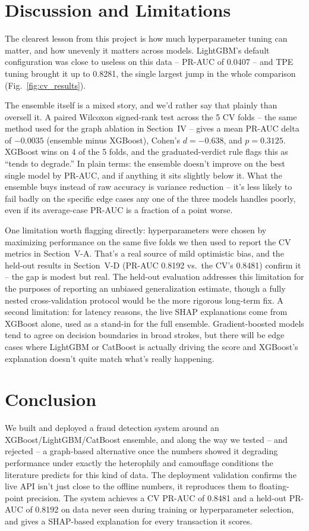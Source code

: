 \documentclass[conference]{IEEEtran}
\begin{document}
\section{Discussion and Limitations}
The clearest lesson from this project is how much hyperparameter tuning can matter, and how unevenly it matters across models. LightGBM's default configuration was close to useless on this data -- PR-AUC of 0.0407 -- and TPE tuning brought it up to 0.8281, the single largest jump in the whole comparison (Fig.~\ref{fig:cv_results}).

The ensemble itself is a mixed story, and we'd rather say that plainly than oversell it. A paired Wilcoxon signed-rank test across the 5 CV folds -- the same method used for the graph ablation in Section~IV -- gives a mean PR-AUC delta of $-0.0035$ (ensemble minus XGBoost), Cohen's $d = -0.638$, and $p = 0.3125$. XGBoost wins on 4 of the 5 folds, and the graduated-verdict rule flags this as ``tends to degrade.'' In plain terms: the ensemble doesn't improve on the best single model by PR-AUC, and if anything it sits slightly below it. What the ensemble buys instead of raw accuracy is variance reduction -- it's less likely to fail badly on the specific edge cases any one of the three models handles poorly, even if its average-case PR-AUC is a fraction of a point worse.

One limitation worth flagging directly: hyperparameters were chosen by maximizing performance on the same five folds we then used to report the CV metrics in Section~V-A. That's a real source of mild optimistic bias, and the held-out results in Section~V-D (PR-AUC 0.8192 vs.\ the CV's 0.8481) confirm it -- the gap is modest but real. The held-out evaluation addresses this limitation for the purposes of reporting an unbiased generalization estimate, though a fully nested cross-validation protocol would be the more rigorous long-term fix. A second limitation: for latency reasons, the live SHAP explanations come from XGBoost alone, used as a stand-in for the full ensemble. Gradient-boosted models tend to agree on decision boundaries in broad strokes, but there will be edge cases where LightGBM or CatBoost is actually driving the score and XGBoost's explanation doesn't quite match what's really happening.

\section{Conclusion}
We built and deployed a fraud detection system around an XGBoost/LightGBM/CatBoost ensemble, and along the way we tested -- and rejected -- a graph-based alternative once the numbers showed it degrading performance under exactly the heterophily and camouflage conditions the literature predicts for this kind of data. The deployment validation confirms the live API isn't just close to the offline numbers, it reproduces them to floating-point precision. The system achieves a CV PR-AUC of 0.8481 and a held-out PR-AUC of 0.8192 on data never seen during training or hyperparameter selection, and gives a SHAP-based explanation for every transaction it scores.



\end{document}
